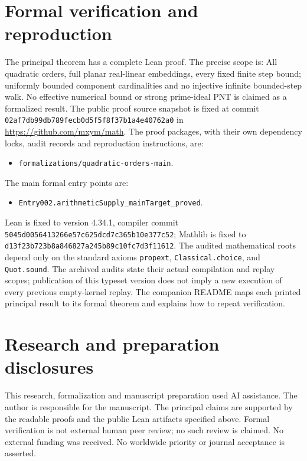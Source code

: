 \documentclass[11pt]{article}
\numberwithin{equation}{section}
\theoremstyle{definition}\newtheorem{definition}[theorem]{Definition}
\theoremstyle{remark}\newtheorem{remark}[theorem]{Remark}
\begin{document}
\section{Formal verification and reproduction}
The principal theorem has a complete Lean proof. The precise scope is:
All quadratic orders, full planar real-linear embeddings, every fixed finite step bound; uniformly bounded component cardinalities and no injective infinite bounded-step walk. No effective numerical bound or strong prime-ideal PNT is claimed as a formalized result.
The public proof source snapshot is fixed at commit
\nolinkurl{02af7db99db789fecb0d5f5f8f37b1a4e40762a0} in \url{https://github.com/mxym/math}.
The proof packages, with their own dependency locks, audit records and
reproduction instructions, are:
\begin{itemize}
\item \nolinkurl{formalizations/quadratic-orders-main}.
\end{itemize}
The main formal entry points are:
\begin{itemize}
\item \nolinkurl{Entry002.arithmeticSupply_mainTarget_proved}.
\end{itemize}
Lean is fixed to version 4.34.1, compiler commit
\nolinkurl{5045d0056413266e57c625dcd7c365b10e377c52}; Mathlib is fixed to
\nolinkurl{d13f23b723b8a846827a245b89c10fc7d3f11612}.
The audited mathematical roots depend only on the standard axioms
\texttt{propext}, \texttt{Classical.choice}, and \texttt{Quot.sound}.
The archived audits state their actual compilation and replay scopes;
publication of this typeset version does not imply a new execution of every
previous empty-kernel replay. The companion README maps each printed
principal result to its formal theorem and explains how to repeat verification.

\section*{Research and preparation disclosures}
This research, formalization and manuscript preparation used AI assistance.
The author is responsible for the manuscript. The principal claims are
supported by the readable proofs and the public Lean artifacts specified
above. Formal verification is not external human peer review; no such review
is claimed. No external funding was received. No worldwide priority or
journal acceptance is asserted.
\end{document}
